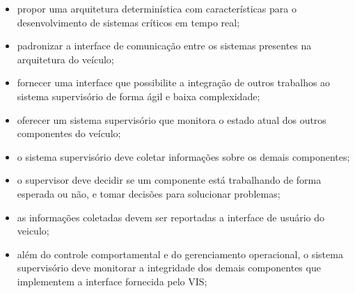 \documentclass[conference]{IEEEtran}
\begin{document}
\begin{itemize}
	\item propor uma arquitetura determinística com características para o desenvolvimento de sistemas críticos em tempo real;
	\item padronizar a interface de comunicação entre os sistemas presentes na arquitetura do veículo;
	\item fornecer uma interface que possibilite a integração de outros trabalhos ao sistema supervisório de forma ágil e baixa complexidade;
	\item oferecer um sistema supervisório que monitora o estado atual dos outros componentes do veículo;
	\item o sistema supervisório deve coletar informações sobre os demais componentes;
	\item o supervisor deve decidir se um componente está trabalhando de forma esperada ou não, e tomar decisões para solucionar problemas;
	\item as informações coletadas devem ser reportadas a interface de usuário do veiculo;
	\item além do controle comportamental e do gerenciamento operacional, o sistema supervisório deve monitorar a integridade dos demais componentes que implementem a interface fornecida pelo VIS;

	
	
	
\end{itemize}


\end{document}
